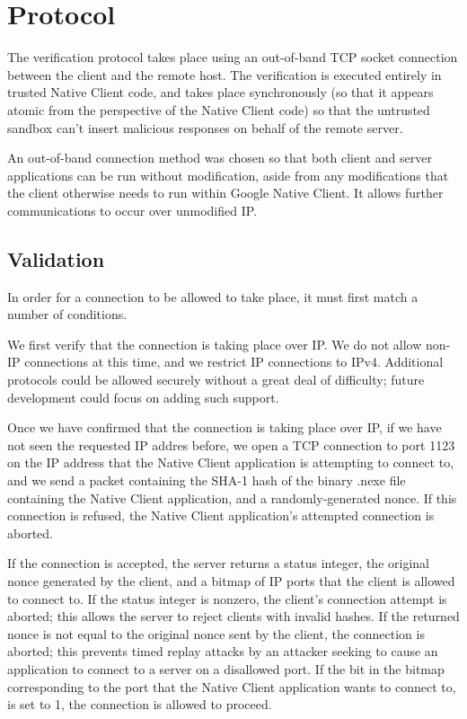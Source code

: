 \documentclass[a4paper,10pt]{article}
\begin{document}
\section{Protocol}

The verification protocol takes place using an out-of-band TCP socket
connection between the client and the remote host.  The verification is
executed entirely in trusted Native Client code, and takes place synchronously
(so that it appears atomic from the perspective of the Native Client code) so
that the untrusted sandbox can't insert malicious responses on behalf of the
remote server.

An out-of-band connection method was chosen so that both client and server
applications can be run without modification, aside from any modifications that
the client otherwise needs to run within Google Native Client.  It allows
further communications to occur over unmodified IP.

\subsection{Validation}

In order for a connection to be allowed to take place, it must first match a
number of conditions.

We first verify that the connection is taking place over IP.  We do not allow
non-IP connections at this time, and we restrict IP connections to IPv4.
Additional protocols could be allowed securely without a great deal of
difficulty; future development could focus on adding such support.

Once we have confirmed that the connection is taking place over IP, if we have
not seen the requested IP addres before, we open a TCP connection to port 1123
on the IP address that the Native Client application is attempting to connect
to, and we send a packet containing the SHA-1 hash of the binary .nexe file
containing the Native Client application, and a randomly-generated nonce.  If
this connection is refused, the Native Client application's attempted connection
is aborted.

If the connection is accepted, the server returns a status integer, the
original nonce generated by the client, and a bitmap of IP ports that the
client is allowed to connect to.  If the status integer is nonzero, the
client's connection attempt is aborted; this allows the server to reject
clients with invalid hashes.  If the returned nonce is not equal to
the original nonce sent by the client, the connection is aborted; this
prevents timed replay attacks by an attacker seeking to cause an application
to connect to a server on a disallowed port.  If the bit in
the bitmap corresponding to the port that the Native Client application wants
to connect to, is set to 1, the connection is allowed to proceed.
\end{document}
